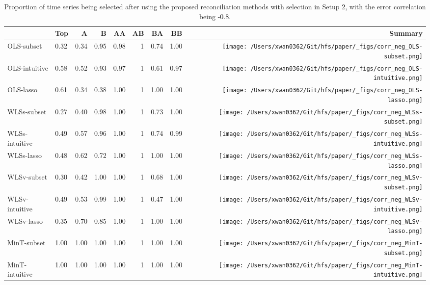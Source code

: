 \documentclass[
  11pt]{article}
\begin{document}
\hypertarget{tbl-corr-selection-neg}{}
\begin{table}
\caption{\label{tbl-corr-selection-neg}Proportion of time series being selected after using the proposed
reconciliation methods with selection in Setup 2, with the error
correlation being -0.8. }\tabularnewline

\centering\begingroup\fontsize{11}{13}\selectfont

\begin{threeparttable}
\begin{tabular}{llrrrrrr>{}r}
\toprule
  & Top & A & B & AA & AB & BA & BB & Summary\\
\midrule
OLS-subset & 0.32 & 0.34 & 0.95 & 0.98 & 1 & 0.74 & 1.00 & \texttt{[image: /Users/xwan0362/Git/hfs/paper/\_figs/corr\_neg\_OLS-subset.png]}\\
OLS-intuitive & 0.58 & 0.52 & 0.93 & 0.97 & 1 & 0.61 & 0.97 & \texttt{[image: /Users/xwan0362/Git/hfs/paper/\_figs/corr\_neg\_OLS-intuitive.png]}\\
OLS-lasso & 0.61 & 0.34 & 0.38 & 1.00 & 1 & 1.00 & 1.00 & \texttt{[image: /Users/xwan0362/Git/hfs/paper/\_figs/corr\_neg\_OLS-lasso.png]}\\
\midrule
WLSs-subset & 0.27 & 0.40 & 0.98 & 1.00 & 1 & 0.73 & 1.00 & \texttt{[image: /Users/xwan0362/Git/hfs/paper/\_figs/corr\_neg\_WLSs-subset.png]}\\
WLSs-intuitive & 0.49 & 0.57 & 0.96 & 1.00 & 1 & 0.74 & 0.99 & \texttt{[image: /Users/xwan0362/Git/hfs/paper/\_figs/corr\_neg\_WLSs-intuitive.png]}\\
WLSs-lasso & 0.48 & 0.62 & 0.72 & 1.00 & 1 & 1.00 & 1.00 & \texttt{[image: /Users/xwan0362/Git/hfs/paper/\_figs/corr\_neg\_WLSs-lasso.png]}\\
\midrule
WLSv-subset & 0.30 & 0.42 & 1.00 & 1.00 & 1 & 0.68 & 1.00 & \texttt{[image: /Users/xwan0362/Git/hfs/paper/\_figs/corr\_neg\_WLSv-subset.png]}\\
WLSv-intuitive & 0.49 & 0.53 & 0.99 & 1.00 & 1 & 0.47 & 1.00 & \texttt{[image: /Users/xwan0362/Git/hfs/paper/\_figs/corr\_neg\_WLSv-intuitive.png]}\\
WLSv-lasso & 0.35 & 0.70 & 0.85 & 1.00 & 1 & 1.00 & 1.00 & \texttt{[image: /Users/xwan0362/Git/hfs/paper/\_figs/corr\_neg\_WLSv-lasso.png]}\\
\midrule
MinT-subset & 1.00 & 1.00 & 1.00 & 1.00 & 1 & 1.00 & 1.00 & \texttt{[image: /Users/xwan0362/Git/hfs/paper/\_figs/corr\_neg\_MinT-subset.png]}\\
MinT-intuitive & 1.00 & 1.00 & 1.00 & 1.00 & 1 & 1.00 & 1.00 & \texttt{[image: /Users/xwan0362/Git/hfs/paper/\_figs/corr\_neg\_MinT-intuitive.png]}\\

\end{tabular}
\end{threeparttable}
\end{table}
\end{document}
